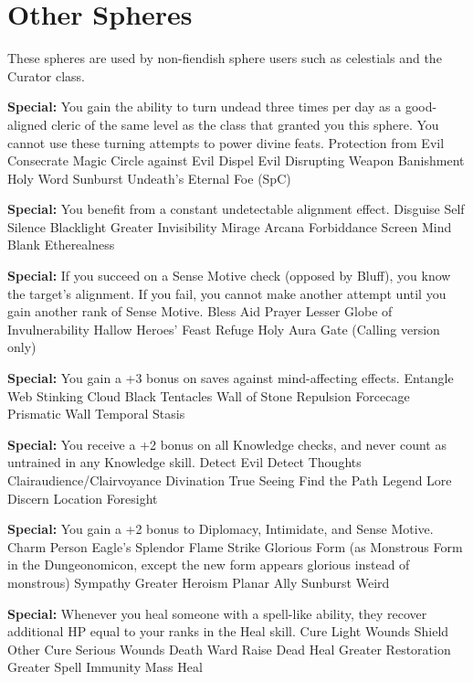 \section{Other Spheres}

These spheres are used by non-fiendish sphere users such as celestials and the Curator class.

\begin{multicols}{2}

\textbf{Special: }{You gain the ability to turn undead three times per day as a good-aligned cleric of the same level as the class that granted you this sphere. You cannot use these turning attempts to power divine feats.}
\sphere
{Protection from Evil}
{Consecrate}
{Magic Circle against Evil}
{Dispel Evil}
{Disrupting Weapon}
{Banishment}
{Holy Word}
{Sunburst}
{Undeath's Eternal Foe (SpC)}

\textbf{Special: }{You benefit from a constant undetectable alignment effect.}
\sphere
{Disguise Self}
{Silence}
{Blacklight}
{Greater Invisibility}
{Mirage Arcana}
{Forbiddance}
{Screen}
{Mind Blank}
{Etherealness}


\textbf{Special: }{If you succeed on a Sense Motive check (opposed by Bluff), you know the target's alignment. If you fail, you cannot make another attempt until you gain another rank of Sense Motive.}
\sphere
{Bless}
{Aid}
{Prayer}
{Lesser Globe of Invulnerability}
{Hallow}
{Heroes' Feast}
{Refuge}
{Holy Aura}
{Gate (Calling version only)}


\textbf{Special: }{You gain a +3 bonus on saves against mind-affecting effects.}
\sphere
{Entangle}
{Web}
{Stinking Cloud}
{Black Tentacles}
{Wall of Stone}
{Repulsion}
{Forcecage}
{Prismatic Wall}
{Temporal Stasis}


\textbf{Special: }{You receive a +2 bonus on all Knowledge checks, and never count as untrained in any Knowledge skill.}
\sphere
{Detect Evil}
{Detect Thoughts}
{Clairaudience/Clairvoyance}
{Divination}
{True Seeing}
{Find the Path}
{Legend Lore}
{Discern Location}
{Foresight}


\textbf{Special: }{You gain a +2 bonus to Diplomacy, Intimidate, and Sense Motive.}
\sphere
{Charm Person}
{Eagle's Splendor}
{Flame Strike}
{Glorious Form (as Monstrous Form in the Dungeonomicon, except the new form appears glorious instead of monstrous)}
{Sympathy}
{Greater Heroism}
{Planar Ally}
{Sunburst}
{Weird}


\textbf{Special: }{Whenever you heal someone with a spell-like ability, they recover additional HP equal to your ranks in the Heal skill.}
\sphere
{Cure Light Wounds}
{Shield Other}
{Cure Serious Wounds}
{Death Ward}
{Raise Dead}
{Heal}
{Greater Restoration}
{Greater Spell Immunity}
{Mass Heal}

\end{multicols}